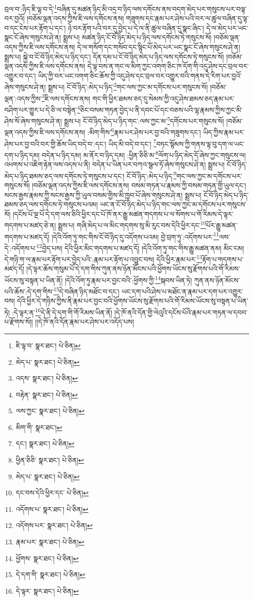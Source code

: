 བྲལ་བ་:ཉིད་ཇི་ལྟ་བ་དེ་\footnote{ཇི་ལྟ་བ་  སྣར་ཐང་།  པེ་ཅིན། }བཞིན་དུ་མཚན་ཉིད་མི་འདྲ་བ་ཉིད་ལས་དགོངས་ནས་བདག་མེད་པར་གསུངས་པར་བལྟ་བར་བྱའོ། །བཅོམ་ལྡན་འདས་ཀྱིས་ཇི་ལས་དགོངས་ནས། གཟུགས་དང་རྣམ་པར་ཤེས་པའི་བར་ལ་ཚུལ་བཞིན་དུ་ལྟ་བ་དང་ངེས་པར་རྟོག་པ་དང་། ཉེ་བར་རྟོག་པའི་བར་དུ་བྱེད་པ་དེ་ལ་ནི་ཚུལ་བཞིན་དུ་སྣང་ཞིང་། དེ་ལ་མེད་པར་ཡང་སྣང་ངོ་ཞེས་གསུངས་ཤེ་ན། སྨྲས་པ། མཚན་ཉིད་ངོ་བོ་ཉིད་མེད་པ་ཉིད་ལས་དགོངས་ཏེ་གསུངས་སོ། །བཅོམ་ལྡན་འདས་ཀྱིས་ཇི་ལས་དགོངས་ནས། དེ་ལ་གསོག་དང་གསོབ་དང་སྙིང་པོ་མེད་པར་ཡང་སྣང་ངོ་ཞེས་གསུངས་ཤེ་ན། སྨྲས་པ། སྐྱེ་བ་ངོ་བོ་ཉིད་མེད་པ་ཉིད་དང་། དོན་དམ་པ་ངོ་བོ་ཉིད་མེད་པ་ཉིད་ལས་དགོངས་ཏེ་གསུངས་སོ། །བཅོམ་ལྡན་འདས་ཀྱིས་ཇི་ལས་དགོངས་ནས། དེ་ལྟ་བས་ན་གང་ལ་མིག་ཀྱང་འགག་ཅིང་ཁ་དོག་གི་འདུ་ཤེས་དང་བྲལ་བར་འགྱུར་བ་དང་། ཡིད་ཀྱི་བར་ཡང་འགག་ཅིང་ཆོས་ཀྱི་འདུ་ཤེས་དང་བྲལ་བར་འགྱུར་བའི་གནས་དེ་རིག་པར་བྱའོ་ཞེས་གསུངས་ཤེ་ན། སྨྲས་པ། ངོ་བོ་ཉིད་:མེད་པ་ཉིད་\footnote{མེད་པ་  སྣར་ཐང་།  པེ་ཅིན། }གང་ལས་ཀྱང་མ་དགོངས་པར་གསུངས་སོ། །བཅོམ་ལྡན་:འདས་ཀྱིས་\footnote{འདས་  སྣར་ཐང་།  པེ་ཅིན། }ཇི་ལས་དགོངས་ནས། གང་གི་ཕྱིར་ཐམས་ཅད་དུ་སེམས་ཀྱི་འདུ་ཤེས་ཐམས་ཅད་རྣམ་པར་བཤིག་པར་གྱུར་པ་དེ་ཅི་ལ་བསྟེན་\footnote{བརྟེན་  སྣར་ཐང་།  པེ་ཅིན། }ཅིང་བསམ་གཏན་བྱེད་པ་ནི་དབང་པོ་དང་བཅས་པའི་ལྷ་རྣམས་ཀྱིས་ཀྱང་མི་ཤེས་སོ་ཞེས་གསུངས་ཤེ་ན། སྨྲས་པ། ངོ་བོ་ཉིད་མེད་པ་ཉིད་གང་:ལས་ཀྱང་མ་\footnote{ལས་ཀྱང་  སྣར་ཐང་།  པེ་ཅིན། }དགོངས་པར་གསུངས་སོ། །བཅོམ་ལྡན་འདས་ཀྱིས་ཇི་ལས་དགོངས་ནས། :མིག་གིས་\footnote{མིག་གི་  སྣར་ཐང་། }རྣམ་པར་ཤེས་པར་བྱ་བའི་གཟུགས་དང་། ཡིད་ཀྱིས་རྣམ་པར་ཤེས་པར་བྱ་བའི་བར་གྱི་ཆོས་ཡིད་བདེ་བ་:དང་། ཡིད་མི་བདེ་བ་དང་། \footnote{དང་།    སྣར་ཐང་།  པེ་ཅིན། }བཏང་སྙོམས་ཀྱི་གནས་ལྟ་བུ་དག་ལ་ཡང་དག་པ་ཉིད་དམ། བདེན་པ་ཉིད་དམ། མ་ནོར་བ་ཉིད་དམ། :ཕྱིན་ཅིཅི་མ་\footnote{ཕྱིན་ཅིཅི་  སྣར་ཐང་།  པེ་ཅིན། }ལོག་པ་ཉིད་མེད་དོ་ཞེས་ཀྱང་གསུངས་ལ། འཕགས་པ་འཇིག་རྟེན་ལས་འདས་པ་ནི། བདེན་པ་ཡིན་པར་བཀའ་སྩལ་ཏོ་ཞེས་གསུངས་ཤེ་ན། སྨྲས་པ། ངོ་བོ་ཉིད་མེད་པ་ཉིད་ཐམས་ཅད་ལས་དགོངས་ཏེ་གསུངས་པ་དང་། ངོ་བོ་ཉིད་:མེད་པ་ཉིད་\footnote{མེད་པ་  སྣར་ཐང་།  པེ་ཅིན། }གང་ལས་ཀྱང་མ་དགོངས་པར་གསུངས་སོ། །བཅོམ་ལྡན་འདས་ཀྱིས་ཇི་ལས་དགོངས་ནས། བསམ་གཏན་པ་རྣམས་ཀྱི་བསམ་གཏན་གྱི་ཡུལ་དང་། སངས་རྒྱས་རྣམས་ཀྱི་སངས་རྒྱས་ཀྱི་ཡུལ་བསམ་གྱིས་མི་ཁྱབ་པོ་ཞེས་གསུངས་ཤེ་ན། སྨྲས་པ། ངོ་བོ་ཉིད་མེད་པ་ཉིད་ཐམས་ཅད་ལས་དགོངས་ཏེ་གསུངས་པའམ། ཡང་ན་ངོ་བོ་ཉིད་མེད་པ་ཉིད་གང་ལས་ཀྱང་མ་དགོངས་པར་གསུངས་སོ། །དངོས་པོ་ལྔ་པོ་དེ་དག་ལས་ཅིའི་ཕྱིར་དང་པོ་ཁོ་ནར་རྒྱུ་མཚན་གདགས་པ་ལ་སོགས་པ་གོ་རིམས་དེ་ལྟར་གདགས་པ་མཛད་ཅེ་ན། སྨྲས་པ། གཞི་མེད་པ་ལ་མིང་གདགས་སུ་མི་རུང་བས་དེའི་ཕྱིར་དང་\footnote{དང་བས་དེའི་ཕྱིར་དང་  པེ་ཅིན། }པོར་རྒྱུ་མཚན་གདགས་པ་མཛད་དོ། །དེའི་འོག་ཏུ་གང་གིས་ངོ་བོ་ཉིད་དུ་འདོགས་པའམ། བྱེ་བྲག་ཏུ་:འདོགས་པར་\footnote{འདོགས་པ་  སྣར་ཐང་།  པེ་ཅིན། }ལས་དེ་:འདོགས་པ་\footnote{འདོགས་པར་  སྣར་ཐང་།  པེ་ཅིན། }བྱེད་པས། དེའི་ཕྱིར་མིང་གདགས་པ་མཛད་དོ། །དེའི་འོག་ཏུ་གང་གིས་རྒྱུ་མཚན་ནམ། མིང་ངམ། དེ་གཉི་ག་ལ་རྣམ་པར་རྟོག་པར་བྱེད་པའི་:རྣམ་པར་རྟོག་པ་འབྱུང་བས། དེའི་ཕྱིར་རྣམ་པར་\footnote{རྣམ་པར་  སྣར་ཐང་།  པེ་ཅིན། }རྟོག་པ་གདགས་པ་མཛད་དོ། །དེ་ལྟར་ཆོས་གསུམ་པོ་དེ་དག་གིས་ཀུན་ནས་ཉོན་མོངས་པའི་ཕྱོགས་ཡོངས་སུ་རྫོགས་པའི་གོ་རིམས་ཡོངས་སུ་བསྟན་པ་ཡིན་ནོ། །དེའི་འོག་ཏུ་རྣམ་པར་བྱང་བའི་:ཕྱོགས་ཀྱི་\footnote{ཕྱོགས་  སྣར་ཐང་།  པེ་ཅིན། }སྐབས་ཡིན་ཏེ། ཀུན་ནས་ཉོན་མོངས་པའི་ཆོས་:དེ་དག་གིས་\footnote{དེ་དག་གི་  སྣར་ཐང་།  པེ་ཅིན། }དེ་བཞིན་ཉིད་མཐོང་བ་དང་། ཡང་དག་པའི་ཤེས་པ་མཐོང་ན་རྣམ་པར་དག་པར་འགྱུར་བས། དེའི་ཕྱིར་དེ་གཉིས་ཀྱིས་ནི་རྣམ་པར་བྱང་བའི་ཕྱོགས་ཡོངས་སུ་རྫོགས་པའི་གོ་རིམས་ཡོངས་སུ་བསྟན་པ་ཡིན་ཏེ། :དེ་ལྟར་ན་\footnote{དེ་ལྟར་  སྣར་ཐང་།  པེ་ཅིན། }དེ་ནི་དེ་དག་གི་གོ་རིམས་ཡིན་ནོ། །དེ་ཁོ་ནའི་དོན་གྱི་ལེའུའི་དངོས་པོའི་རྣམ་པར་གཏན་ལ་དབབ་པ་རྫོགས་སོ།། །།དེ་ཁོ་ནའི་དོན་རྣམ་པར་ཤེས་པར་འདོད་པས། 